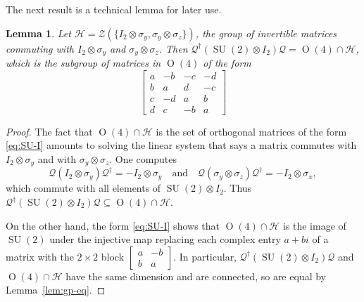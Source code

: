 \documentclass[reqno]{amsart}
\newtheorem{lemma}[theorem]{Lemma}
\theoremstyle{definition} \newtheorem{example}[theorem]{Example}
\newcommand{\SU}{\operatorname{SU}}
\renewcommand{\O}{\operatorname{O}}
\renewcommand{\H}{\mathcal{H}}
\newcommand{\Q}{\mathcal{Q}}
\newcommand{\Z}{\mathcal{Z}}
\begin{document}
The next result is a technical lemma for later use.
\begin{lemma} \label{lem:SU-I}
Let $\H = \Z(\{I_2 \otimes \sigma_y,\sigma_y \otimes \sigma_z\})$, the group of invertible matrices commuting with $I_2 \otimes \sigma_y$ and $\sigma_y \otimes \sigma_z$. Then $\Q^{\dagger} (\SU(2) \otimes I_2)\Q = \O(4) \cap \H$, which is the subgroup of matrices in $\O(4)$ of the form
\begin{equation} \label{eq:SU-I}
\begin{bmatrix}
a & -b & -c & -d\\
b & a  & d  & -c\\
c & -d & a & b\\
d & c  & -b & a
\end{bmatrix}
\end{equation}
\end{lemma}

\begin{proof}
The fact that $\O(4) \cap \H$ is the set of orthogonal matrices of the form \eqref{eq:SU-I} amounts to solving the linear system that says a matrix commutes with $I_2 \otimes \sigma_y$ and with $\sigma_y \otimes \sigma_z$. One computes
\begin{equation*}
\Q(I_2 \otimes \sigma_y)\Q^\dagger = -I_2 \otimes \sigma_y \quad \text{and} \quad \Q(\sigma_y \otimes \sigma_z)\Q^\dagger = -I_2 \otimes \sigma_x,
\end{equation*}
which commute with all elements of $\SU(2) \otimes I_2$. Thus $\Q^\dagger(\SU(2) \otimes I_2)\Q \subseteq \O(4) \cap \H$.

On the other hand, the form \eqref{eq:SU-I} shows that $\O(4) \cap \H$ is the image of $\SU(2)$ under the injective map replacing each complex entry $a+bi$ of a matrix with the $2 \times 2$ block $\left[ \begin{smallmatrix} a & -b \\ b & a \end{smallmatrix} \right]$. In particular, $\Q^\dagger(\SU(2) \otimes I_2)\Q$ and $\O(4) \cap \H$ have the same dimension and are connected, so are equal by Lemma~\ref{lem:gp-eq}.
\end{proof}
\end{document}
